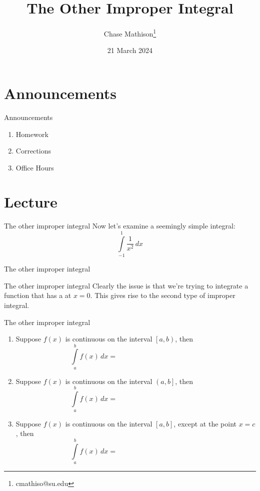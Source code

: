 \documentclass[presentation]{beamer}
\institute[SU]{Shenandoah University}
\author{Chase Mathison\thanks{cmathiso@su.edu}}
\date{21 March 2024}
\title{The Other Improper Integral}
\begin{document}
\maketitle

\section{Announcements}
\label{sec:org220291f}
\begin{frame}[label={sec:org156a6bc}]{Announcements}
\begin{enumerate}
\item Homework
\item Corrections
\item Office Hours
\end{enumerate}
\end{frame}

\section{Lecture}
\label{sec:orgbc75d85}
\begin{frame}[label={sec:org564bd1c}]{The other improper integral}
Now let's examine a seemingly simple integral:
\[
\int\limits_{-1}^1 \frac{1}{x^2}\,dx\]
\vspace{10in}
\end{frame}

\begin{frame}[label={sec:org6c7ee70}]{The other improper integral}
\end{frame}

\begin{frame}[label={sec:org3f37e5c}]{The other improper integral}
Clearly the issue is that we're trying to integrate a function that
has a \uline{\hspace*{1in}} at \(x = 0\).  This gives rise to the second
type of improper integral.
\end{frame}

\begin{frame}[label={sec:org547566b}]{The other improper integral}
\begin{enumerate}
\item Suppose \(f(x)\) is continuous on the interval \(\left[ a,b
   \right)\), then \[ \int\limits_a^b f(x)\,dx = \hspace{2in}\]

\item Suppose \(f(x)\) is continuous on the interval \(\left( a,b
   \right]\), then \[ \int\limits_a^b f(x)\,dx= \hspace{2in}\]

\item Suppose \(f(x)\) is continuous on the interval \(\left[ a,b
   \right]\), except at the point \(x = c\), then \[ \int\limits_a^b f(x)\,dx =
   \hspace{2in}\]
\end{enumerate}
\end{frame}
\end{document}
